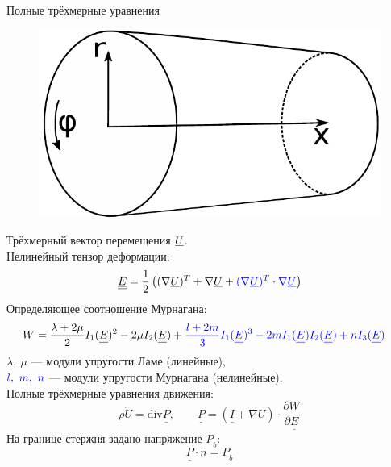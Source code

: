 \documentclass[usenames,dvipsnames]{beamer}
\newcommand{\lb}{\left (}
\newcommand{\rb}{\right )}
\newcommand{\vect}[1]{\underline{#1}}
\newcommand{\tens}[1]{\underline{\underline{#1}}}
\newcommand{\divg}{\text{div}}
\newcommand{\pdiff}[2]{\frac{\partial #1}{\partial #2}}
\begin{document}
\begin{frame}{Полные трёхмерные уравнения}
\begin{figure}
	\vspace{-2mm}
	\includegraphics[width=\linewidth]{Figures/1_RodSchematic}
\end{figure}
Трёхмерный вектор перемещения $\color{black}\vect{U}$.\\
\vspace{1mm}
Нелинейный тензор деформации:
\begin{equation*}
\tens{E} = \frac12 \lb(\nabla\vect{U})^T + \nabla\vect{U} + {\color{blue}(\nabla\vect{U})^T\cdot\nabla\vect{U}}\rb
\end{equation*}
Определяющее соотношение Мурнагана:
\small
\begin{align*}
&W = \frac{\lambda + 2\mu}{2}I_1(\tens{E})^2 - 2\mu I_2(\tens{E}) +\color{blue} \frac{l+2m}{3}I_1(\tens{E})^3 - 2m I_1(\tens{E}) I_2(\tens{E}) + n I_3(\tens{E})
\end{align*}
$\lambda,\ \mu$ --- модули упругости Ламе (линейные),\\
$\color{blue}l,\ m,\ n$ --- модули упругости Мурнагана (нелинейные).\\
\vspace{1mm}
\normalsize
Полные трёхмерные уравнения движения:
\begin{equation}\nonumber
\rho\ddot{\vect{U}} = \divg\tens{P}, \qquad \tens{P} = (\tens{I} + \nabla\vect{U}) \cdot \pdiff{W}{\tens{E}}
\end{equation}
На границе стержня задано напряжение $\vect{P}_b$:
\begin{equation}\nonumber
\tens{P}\cdot \vect{n} = \vect{P}_b
\end{equation}
\end{frame}
\end{document}
